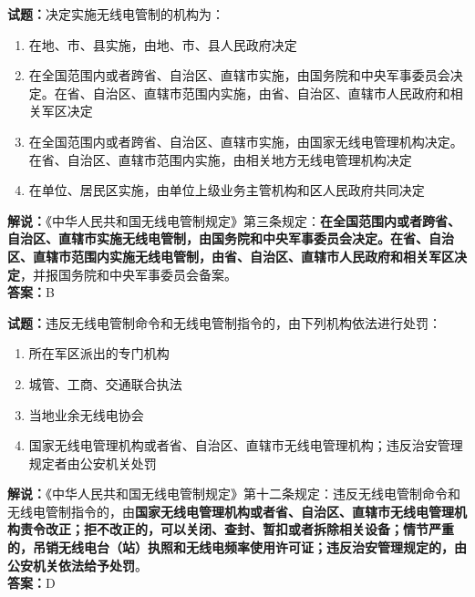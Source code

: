 \documentclass{ctexbook}
\begin{document}
\vspace{1em}

\textbf{试题：}决定实施无线电管制的机构为：
\begin{enumerate}[leftmargin=3em]
  \item 在地、市、县实施，由地、市、县人民政府决定
  \item 在全国范围内或者跨省、自治区、直辖市实施，由国务院和中央军事委员会决定。在省、自治区、直辖市范围内实施，由省、自治区、直辖市人民政府和相关军区决定
  \item 在全国范围内或者跨省、自治区、直辖市实施，由国家无线电管理机构决定。在省、自治区、直辖市范围内实施，由相关地方无线电管理机构决定
  \item 在单位、居民区实施，由单位上级业务主管机构和区人民政府共同决定
\end{enumerate}
\noindent\textbf{解说：}《中华人民共和国无线电管制规定》第三条规定：\textbf{在全国范围内或者跨省、自治区、直辖市实施无线电管制，由国务院和中央军事委员会决定。在省、自治区、直辖市范围内实施无线电管制，由省、自治区、直辖市人民政府和相关军区决定}，并报国务院和中央军事委员会备案。\\\noindent\textbf{答案：}B

\vspace{1em}

\textbf{试题：}违反无线电管制命令和无线电管制指令的，由下列机构依法进行处罚：
\begin{enumerate}[leftmargin=3em]
  \item 所在军区派出的专门机构
  \item 城管、工商、交通联合执法
  \item 当地业余无线电协会
  \item 国家无线电管理机构或者省、自治区、直辖市无线电管理机构；违反治安管理规定者由公安机关处罚
\end{enumerate}
\noindent\textbf{解说：}《中华人民共和国无线电管制规定》第十二条规定：违反无线电管制命令和无线电管制指令的，由\textbf{国家无线电管理机构或者省、自治区、直辖市无线电管理机构责令改正；拒不改正的，可以关闭、查封、暂扣或者拆除相关设备；情节严重的，吊销无线电台（站）执照和无线电频率使用许可证；违反治安管理规定的，由公安机关依法给予处罚}。\\\noindent\textbf{答案：}D

\vspace{1em}
\end{document}
